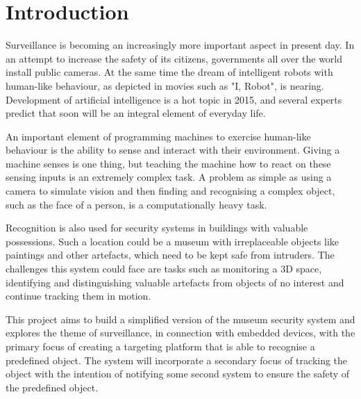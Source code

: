 \chapter{Introduction}\label{chpt:introduction}
Surveillance is becoming an increasingly more important aspect in present day. In an attempt to increase the safety of its citizens, governments all over the world install public cameras\cite{city_surveillance}. At the same time the dream of intelligent robots with human-like behaviour, as depicted in movies such as "I, Robot"\cite{imdb_robot}, is nearing. Development of artificial intelligence is a hot topic in 2015, and several experts predict that  soon will be an integral element of everyday life\cite{ai_microsoft}.

An important element of programming machines to exercise human-like behaviour is the ability to sense and interact with their environment. Giving a machine senses is one thing, but teaching the machine how to react on these sensing inputs is an extremely complex task\cite{facebook_ai}. A problem as simple as using a camera to simulate vision and then finding and recognising a complex object, such as the face of a person, is a computationally heavy task\cite{ai_facial_recog}.


Recognition is also used for security systems in buildings with valuable possessions. Such a location could be a museum with irreplaceable objects like paintings and other artefacts, which need to be kept safe from intruders. The challenges this system could face are tasks such as monitoring a 3D space, identifying and distinguishing valuable artefacts from objects of no interest and continue tracking them in motion.

This project aims to build a simplified version of the museum security system and explores the theme of surveillance, in connection with embedded devices, with the primary focus of creating a targeting platform that is able to recognise a predefined object. The system will incorporate a secondary focus of tracking the object with the intention of notifying some second system to ensure the safety of the predefined object.

